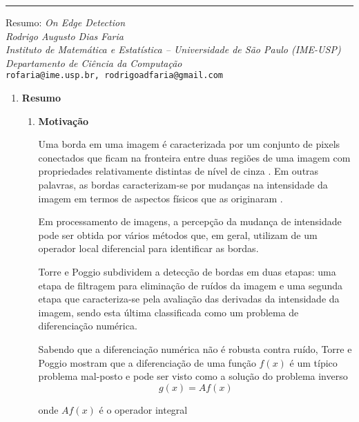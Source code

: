 \noindent\rule{14.5cm}{0.4pt}

\begin{center}
    {\Large Resumo: \textit{On Edge Detection}}
    \\[8pt]
    
    \textit{Rodrigo Augusto Dias Faria}
    \\[8pt]
    
    \textit{Instituto de Matemática e Estatística -- Universidade de São Paulo (IME-USP)\\
    Departamento de Ciência da Computação
    }\\[8pt]
    
    \texttt{rofaria@ime.usp.br, rodrigoadfaria@gmail.com}
\end{center}

\begin{enumerate}
\item \textbf{Resumo}
\begin{enumerate}[label*=\arabic*.]
    \item \textbf{Motivação}
    
    Uma borda em uma imagem é caracterizada por um conjunto de pixels conectados que ficam na fronteira entre duas regiões de uma imagem com propriedades relativamente distintas de nível de cinza \cite{gonzalez2002digital}. Em outras palavras, as bordas caracterizam-se por mudanças na intensidade da imagem em termos de aspectos físicos que as originaram \cite{Torre-1986}.
    
    Em processamento de imagens, a percepção da mudança de intensidade pode ser obtida por vários métodos que, em geral, utilizam de um operador local diferencial para identificar as bordas.
    
    Torre e Poggio subdividem a detecção de bordas em duas etapas: uma etapa de filtragem para eliminação de ruídos da imagem  e uma segunda etapa que caracteriza-se pela avaliação das derivadas da intensidade da imagem, sendo esta última classificada como um problema de diferenciação numérica.
    
    Sabendo que a diferenciação numérica não é robusta contra ruído, Torre e Poggio mostram que a diferenciação de uma função $f(x)$ é um típico problema mal-posto e pode ser visto como a solução do problema inverso
\begin{equation} \label{eq:inverse_problem}
   g(x) = A f(x)
\end{equation}

onde $A f(x)$ é o operador integral


\end{enumerate}
\end{enumerate}
